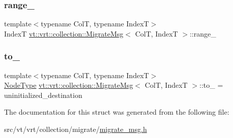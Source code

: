 \mbox{\label{structvt_1_1vrt_1_1collection_1_1_migrate_msg_aa5ae1696b48cdc6cfbc27cebe492b4be}} 
\subsubsection{\texorpdfstring{range\+\_\+}{range\_}}
{\footnotesize\ttfamily template$<$typename ColT, typename IndexT$>$ \\
IndexT \hyperlink{structvt_1_1vrt_1_1collection_1_1_migrate_msg}{vt\+::vrt\+::collection\+::\+Migrate\+Msg}$<$ ColT, IndexT $>$\+::range\+\_\+\hspace{0.3cm}{\ttfamily [private]}}

\mbox{\label{structvt_1_1vrt_1_1collection_1_1_migrate_msg_a8bb8dc33230f27eef17bc2beb07ab32a}} 
\subsubsection{\texorpdfstring{to\+\_\+}{to\_}}
{\footnotesize\ttfamily template$<$typename ColT, typename IndexT$>$ \\
\hyperlink{namespacevt_a866da9d0efc19c0a1ce79e9e492f47e2}{Node\+Type} \hyperlink{structvt_1_1vrt_1_1collection_1_1_migrate_msg}{vt\+::vrt\+::collection\+::\+Migrate\+Msg}$<$ ColT, IndexT $>$\+::to\+\_\+ = uninitialized\+\_\+destination\hspace{0.3cm}{\ttfamily [private]}}



The documentation for this struct was generated from the following file\+:\begin{DoxyCompactItemize}
\item 
src/vt/vrt/collection/migrate/\hyperlink{migrate__msg_8h}{migrate\+\_\+msg.\+h}\end{DoxyCompactItemize}
